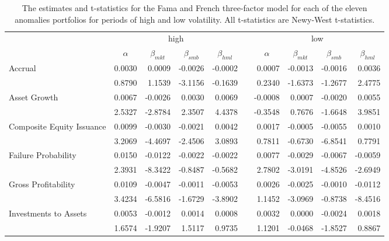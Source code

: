 \begin{table}[htbp]
    \caption{\newline The estimates and t-statistics for the Fama and French three-factor model for each of the eleven anomalies portfolios for periods of high and low volatility.  All t-statistics are Newy-West t-statistics.}
      \begin{tabular}{lrrrrlrrrr}
      \toprule
            & \multicolumn{4}{c}{high}      &       & \multicolumn{4}{c}{low} \\
  \cmidrule{2-5}\cmidrule{7-10}          & \multicolumn{1}{c}{$\alpha$} & \multicolumn{1}{c}{$\beta_{mkt}$} & \multicolumn{1}{c}{$\beta_{smb}$} & \multicolumn{1}{c}{$\beta_{hml}$} &       & \multicolumn{1}{c}{$\alpha$} & \multicolumn{1}{c}{$\beta_{mkt}$} & \multicolumn{1}{c}{$\beta_{smb}$} & \multicolumn{1}{c}{$\beta_{hml}$} \\
      \midrule
      Accrual & 0.0030 & 0.0009 & -0.0026 & -0.0002 &       & 0.0007 & -0.0013 & -0.0016 & 0.0036 \\
            & 0.8790 & 1.1539 & -3.1156 & -0.1639 &       & 0.2340 & -1.6373 & -1.2677 & 2.4775 \\
      Asset Growth & 0.0067 & -0.0026 & 0.0030 & 0.0069 &       & -0.0008 & 0.0007 & -0.0020 & 0.0055 \\
            & 2.5327 & -2.8784 & 2.3507 & 4.4378 &       & -0.3548 & 0.7676 & -1.6648 & 3.9851 \\
      Composite Equity Issuance & 0.0099 & -0.0030 & -0.0021 & 0.0042 &       & 0.0017 & -0.0005 & -0.0055 & 0.0010 \\
            & 3.2069 & -4.4697 & -2.4506 & 3.0893 &       & 0.7811 & -0.6730 & -6.8541 & 0.7791 \\
      Failure Probability & 0.0150 & -0.0122 & -0.0022 & -0.0022 &       & 0.0077 & -0.0029 & -0.0067 & -0.0059 \\
            & 2.3931 & -8.3422 & -0.8487 & -0.5682 &       & 2.7802 & -3.0191 & -4.8526 & -2.6949 \\
      Gross Profitability & 0.0109 & -0.0047 & -0.0011 & -0.0053 &       & 0.0026 & -0.0025 & -0.0010 & -0.0112 \\
            & 3.4234 & -6.5816 & -1.6729 & -3.8902 &       & 1.1452 & -3.0969 & -0.8738 & -8.4516 \\
      Investments to Assets & 0.0053 & -0.0012 & 0.0014 & 0.0008 &       & 0.0032 & 0.0000 & -0.0024 & 0.0018 \\
            & 1.6574 & -1.9207 & 1.5117 & 0.9735 &       & 1.1201 & -0.0468 & -1.8527 & 0.8867 \\

\end{tabular}
\end{table}
